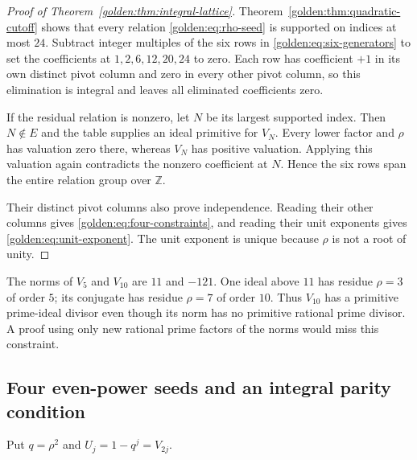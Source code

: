 \begin{proof}[Proof of Theorem~\ref{golden:thm:integral-lattice}]
Theorem~\ref{golden:thm:quadratic-cutoff} shows that every relation
\eqref{golden:eq:rho-seed} is supported on indices at most $24$.
Subtract integer multiples of the six rows in
\eqref{golden:eq:six-generators} to set the coefficients at
$1,2,6,12,20,24$ to zero.  Each row has coefficient $+1$ in its
own distinct pivot column and zero in every other pivot column, so
this elimination is integral and leaves all eliminated coefficients
zero.

If the residual relation is nonzero, let $N$ be its largest supported
index.  Then $N\notin E$ and the table supplies an ideal primitive
for $V_N$.  Every lower factor and $\rho$ has valuation zero there,
whereas $V_N$ has positive valuation.  Applying this valuation again
contradicts the nonzero coefficient at $N$.  Hence the six rows span
the entire relation group over $\mathbb Z$.

Their distinct pivot columns also prove independence.  Reading their
other columns gives \eqref{golden:eq:four-constraints}, and reading
their unit exponents gives \eqref{golden:eq:unit-exponent}.  The unit
exponent is unique because $\rho$ is not a root of unity.
\end{proof}

\begin{remark}
The norms of $V_5$ and $V_{10}$ are $11$ and $-121$.
One ideal above $11$ has residue $\rho=3$ of order $5$; its conjugate
has residue $\rho=7$ of order $10$.  Thus $V_{10}$ has a primitive
prime-ideal divisor even though its norm has no primitive rational
prime divisor.  A proof using only new rational prime factors of the
norms would miss this constraint.
\end{remark}

\subsection{Four even-power seeds and an integral parity condition}
\label{golden:subsec:even-seeds}

Put $q=\rho^2$ and $U_j=1-q^j=V_{2j}$.

